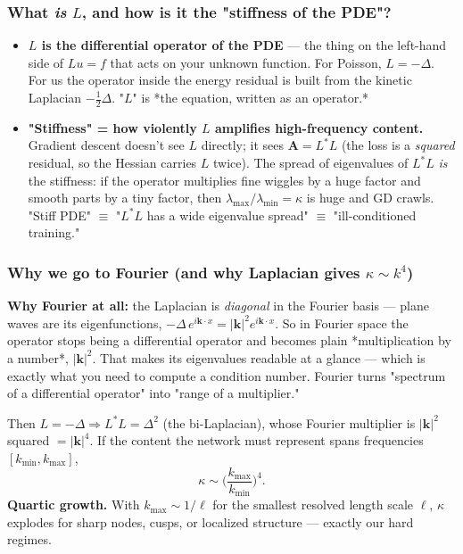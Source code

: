 \documentclass[11pt]{article}
\begin{document}
\subsubsection*{What \emph{is} $L$, and how is it the "stiffness of the PDE"?}

\begin{itemize}
\item \textbf{$L$ is the differential operator of the PDE} --- the thing on the
left-hand side of $Lu = f$ that acts on your unknown function. For
Poisson, $L = -\Delta$. For us the operator inside the energy residual is
built from the kinetic Laplacian $-\tfrac12\Delta$. "$L$" is *the
equation, written as an operator.*
\item \textbf{"Stiffness" = how violently $L$ amplifies high-frequency content.}
Gradient descent doesn't see $L$ directly; it sees $\mathbf A = L^*L$
(the loss is a \emph{squared} residual, so the Hessian carries $L$ twice). The
spread of eigenvalues of $L^*L$ \emph{is} the stiffness: if the operator
multiplies fine wiggles by a huge factor and smooth parts by a tiny
factor, then $\lambda_{\max}/\lambda_{\min} = \kappa$ is huge and GD
crawls. "Stiff PDE" $\equiv$ "$L^*L$ has a wide eigenvalue spread"
$\equiv$ "ill-conditioned training."
\end{itemize}
\subsubsection*{Why we go to Fourier (and why Laplacian gives $\kappa \sim k^4$)}

\textbf{Why Fourier at all:} the Laplacian is \emph{diagonal} in the Fourier basis ---
plane waves are its eigenfunctions, $-\Delta\,e^{i\mathbf k\cdot x} =
|\mathbf k|^2 e^{i\mathbf k\cdot x}$. So in Fourier space the operator stops
being a differential operator and becomes plain *multiplication by a
number*, $|\mathbf k|^2$. That makes its eigenvalues readable at a glance ---
which is exactly what you need to compute a condition number. Fourier turns
"spectrum of a differential operator" into "range of a multiplier."

Then $L = -\Delta \Rightarrow L^*L = \Delta^2$ (the bi-Laplacian), whose
Fourier multiplier is $|\mathbf k|^2$ squared $= |\mathbf k|^4$. If the
content the network must represent spans frequencies $[k_{\min}, k_{\max}]$,
\[\kappa \sim \Big(\frac{k_{\max}}{k_{\min}}\Big)^4.\]
\textbf{Quartic growth.} With $k_{\max} \sim 1/\ell$ for the smallest resolved
length scale $\ell$, $\kappa$ explodes for sharp nodes, cusps, or localized
structure --- exactly our hard regimes.
\end{document}
